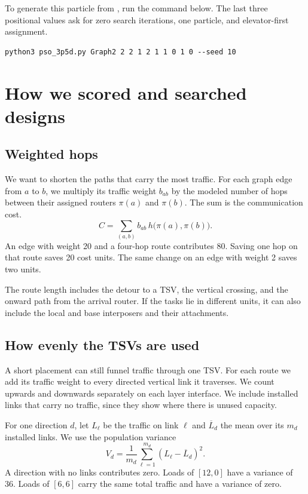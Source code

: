 \documentclass[12pt,a4paper]{article}
\begin{document}
To generate this particle from , run the command below. The last three positional values ask for zero search iterations, one particle, and elevator-first assignment.

{\small
\begin{verbatim}
python3 pso_3p5d.py Graph2 2 2 1 2 1 1 0 1 0 --seed 10
\end{verbatim}
}

\clearpage
\section{How we scored and searched designs}

\subsection{Weighted hops}

We want to shorten the paths that carry the most traffic. For each graph edge from \(a\) to \(b\), we multiply its traffic weight \(b_{ab}\) by the modeled number of hops between their assigned routers \(\pi(a)\) and \(\pi(b)\). The sum is the communication cost.
\[
C=\sum_{(a,b)} b_{ab}\,h\bigl(\pi(a),\pi(b)\bigr).
\]
An edge with weight 20 and a four-hop route contributes 80. Saving one hop on that route saves 20 cost units. The same change on an edge with weight 2 saves two units.

The route length includes the detour to a TSV, the vertical crossing, and the onward path from the arrival router. If the tasks lie in different units, it can also include the local and base interposers and their attachments.

\subsection{How evenly the TSVs are used}

A short placement can still funnel traffic through one TSV. For each route we add its traffic weight to every directed vertical link it traverses. We count upwards and downwards separately on each layer interface. We include installed links that carry no traffic, since they show where there is unused capacity.

For one direction \(d\), let \(L_\ell\) be the traffic on link \(\ell\) and \(\overline L_d\) the mean over its \(m_d\) installed links. We use the population variance
\[
V_d=\frac{1}{m_d}\sum_{\ell=1}^{m_d}(L_\ell-\overline L_d)^2.
\]
A direction with no links contributes zero. Loads of \([12,0]\) have a variance of 36. Loads of \([6,6]\) carry the same total traffic and have a variance of zero.
\end{document}
